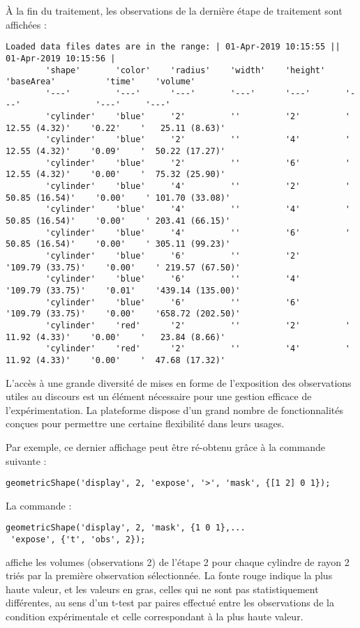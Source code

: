 \`A la fin du traitement, les observations de la dernière étape de traitement sont affichées :
\begin{Verbatim}[fontsize=\scriptsize]
	Loaded data files dates are in the range: | 01-Apr-2019 10:15:55 || 01-Apr-2019 10:15:56 |
	    'shape'       'color'    'radius'    'width'    'height'    'baseArea'          'time'    'volume'
	    '---'         '---'      '---'       '---'      '---'       '---'               '---'     '---'
	    'cylinder'    'blue'     '2'         ''         '2'         '  12.55 (4.32)'    '0.22'    '   25.11 (8.63)'
	    'cylinder'    'blue'     '2'         ''         '4'         '  12.55 (4.32)'    '0.09'    '  50.22 (17.27)'
	    'cylinder'    'blue'     '2'         ''         '6'         '  12.55 (4.32)'    '0.00'    '  75.32 (25.90)'
	    'cylinder'    'blue'     '4'         ''         '2'         ' 50.85 (16.54)'    '0.00'    ' 101.70 (33.08)'
	    'cylinder'    'blue'     '4'         ''         '4'         ' 50.85 (16.54)'    '0.00'    ' 203.41 (66.15)'
	    'cylinder'    'blue'     '4'         ''         '6'         ' 50.85 (16.54)'    '0.00'    ' 305.11 (99.23)'
	    'cylinder'    'blue'     '6'         ''         '2'         '109.79 (33.75)'    '0.00'    ' 219.57 (67.50)'
	    'cylinder'    'blue'     '6'         ''         '4'         '109.79 (33.75)'    '0.01'    '439.14 (135.00)'
	    'cylinder'    'blue'     '6'         ''         '6'         '109.79 (33.75)'    '0.00'    '658.72 (202.50)'
	    'cylinder'    'red'      '2'         ''         '2'         '  11.92 (4.33)'    '0.00'    '   23.84 (8.66)'
	    'cylinder'    'red'      '2'         ''         '4'         '  11.92 (4.33)'    '0.00'    '  47.68 (17.32)'
\end{Verbatim}

L'accès à une grande diversité de mises en forme de l'exposition des observations utiles au discours est un élément nécessaire pour une gestion efficace de l'expérimentation. La plateforme \explanes dispose d'un grand nombre de fonctionnalités conçues pour permettre une certaine flexibilité dans leurs usages.

Par exemple, ce dernier affichage peut être ré-obtenu grâce à la commande suivante :
\begin{lstlisting}
geometricShape('display', 2, 'expose', '>', 'mask', {[1 2] 0 1});
\end{lstlisting}
La commande :
\begin{lstlisting}
geometricShape('display', 2, 'mask', {1 0 1},...
 'expose', {'t', 'obs', 2});
\end{lstlisting}
affiche les volumes (observations 2) de l'étape 2 pour chaque cylindre de rayon 2 triés par la première observation sélectionnée. La fonte rouge indique la plus haute valeur, et les valeurs en gras, celles qui ne sont pas statistiquement différentes, au sens d'un t-test par paires effectué entre les observations de la condition expérimentale et celle correspondant à la plus haute valeur.

